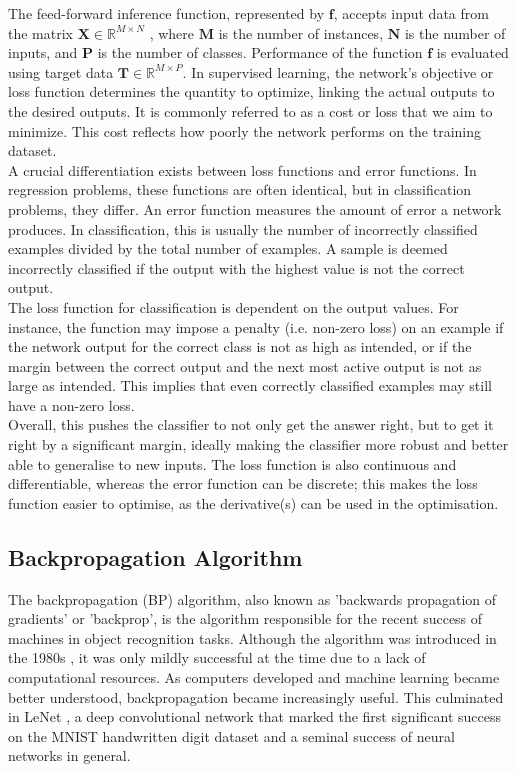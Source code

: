 \noindent The feed-forward inference function, represented by $\mathbf{f}$, accepts input data from the matrix $\mathbf{X} \in \mathbb{R}^{M \times N}$ , where $\mathbf{M}$ is the number of instances, $\mathbf{N}$ is the number of inputs, and $\mathbf{P}$ is the number of classes. Performance of the function $\mathbf{f}$ is evaluated using target data $\mathbf{T} \in \mathbb{R}^{M \times P}$. In supervised learning, the network's objective or loss function determines the quantity to optimize, linking the actual outputs to the desired outputs. It is commonly referred to as a cost or loss that we aim to minimize. This cost reflects how poorly the network performs on the training dataset. \\

\noindent A crucial differentiation exists between loss functions and error functions. In regression problems, these functions are often identical, but in classification problems, they differ. An error function measures the amount of error a network produces. In classification, this is usually the number of incorrectly classified examples divided by the total number of examples. A sample is deemed incorrectly classified if the output with the highest value is not the correct output. \\

\noindent The loss function for classification is dependent on the output values. For instance, the function may impose a penalty (i.e. non-zero loss) on an example if the network output for the correct class is not as high as intended, or if the margin between the correct output and the next most active output is not as large as intended. This implies that even correctly classified examples may still have a non-zero loss.\\

\noindent Overall, this pushes the classifier to not only get the answer right, but to get it right by a significant margin, ideally making the classifier more robust and better able to generalise to new inputs. The loss function is also continuous and differentiable, whereas the error function can be discrete; this makes the loss function easier to optimise, as the derivative(s) can be used in the optimisation.

\subsection[Backpropagation Algorithm]{Backpropagation Algorithm}

The backpropagation (BP) algorithm, also known as 'backwards propagation of gradients' or 'backprop', is the algorithm responsible for the recent success of machines in object recognition tasks. Although the algorithm was introduced in the 1980s \cite{rumelhart1986learning}, it was only mildly successful at the time due to a lack of computational resources. As computers developed and machine learning became better understood, backpropagation became increasingly useful. This culminated in LeNet \cite{lecun1998gradient}, a deep convolutional network that marked the first significant success on the MNIST handwritten digit dataset and a seminal success of neural networks in general. \\ 

